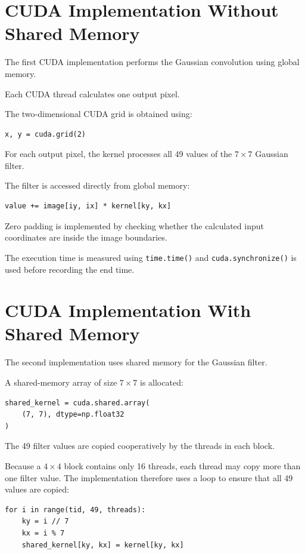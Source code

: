 \documentclass[11pt]{article}
\begin{document}
\section{CUDA Implementation Without Shared Memory}

The first CUDA implementation performs the Gaussian convolution using
global memory.

Each CUDA thread calculates one output pixel.

The two-dimensional CUDA grid is obtained using:

\begin{verbatim}
x, y = cuda.grid(2)
\end{verbatim}

For each output pixel, the kernel processes all 49 values of the
$7\times7$ Gaussian filter.

The filter is accessed directly from global memory:

\begin{verbatim}
value += image[iy, ix] * kernel[ky, kx]
\end{verbatim}

Zero padding is implemented by checking whether the calculated input
coordinates are inside the image boundaries.

The execution time is measured using \texttt{time.time()} and
\texttt{cuda.synchronize()} is used before recording the end time.

\section{CUDA Implementation With Shared Memory}

The second implementation uses shared memory for the Gaussian filter.

A shared-memory array of size $7\times7$ is allocated:

\begin{verbatim}
shared_kernel = cuda.shared.array(
    (7, 7), dtype=np.float32
)
\end{verbatim}

The 49 filter values are copied cooperatively by the threads in each
block.

Because a $4\times4$ block contains only 16 threads, each thread may
copy more than one filter value. The implementation therefore uses a
loop to ensure that all 49 values are copied:

\begin{verbatim}
for i in range(tid, 49, threads):
    ky = i // 7
    kx = i % 7
    shared_kernel[ky, kx] = kernel[ky, kx]
\end{verbatim}
\end{document}
